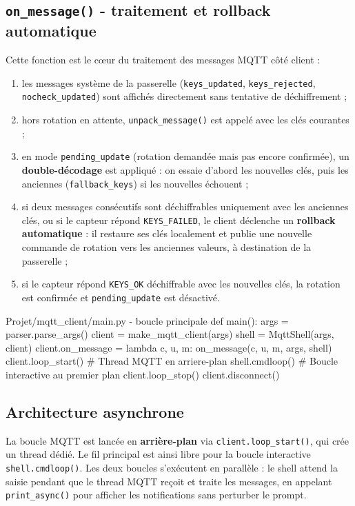 \documentclass[a4paper,11pt]{report}
\begin{document}
\subsection{\texttt{on\_message()} - traitement et rollback automatique}
Cette fonction est le cœur du traitement des messages MQTT côté client :
\begin{enumerate}
    \item les messages système de la passerelle (\texttt{keys\_updated}, \texttt{keys\_rejected},
    \texttt{nocheck\_updated}) sont affichés directement sans tentative de déchiffrement ;
    \item hors rotation en attente, \texttt{unpack\_message()} est appelé avec les clés courantes ;
    \item en mode \texttt{pending\_update} (rotation demandée mais pas encore confirmée), un
    \textbf{double-décodage} est appliqué : on essaie d'abord les nouvelles clés, puis les anciennes
    (\texttt{fallback\_keys}) si les nouvelles échouent ;
    \item si deux messages consécutifs sont déchiffrables uniquement avec les anciennes clés, ou si le
    capteur répond \texttt{KEYS\_FAILED}, le client déclenche un \textbf{rollback automatique} : il
    restaure ses clés localement et publie une nouvelle commande de rotation vers les anciennes valeurs,
    à destination de la passerelle ;
    \item si le capteur répond \texttt{KEYS\_OK} déchiffrable avec les nouvelles clés, la rotation est
    confirmée et \texttt{pending\_update} est désactivé.
\end{enumerate}

\begin{pycode}{Projet/mqtt\_client/main.py - boucle principale}
def main():
    args = parser.parse_args()
    client = make_mqtt_client(args)
    shell = MqttShell(args, client)
    client.on_message = lambda c, u, m: on_message(c, u, m, args, shell)
    client.loop_start()   # Thread MQTT en arriere-plan
    shell.cmdloop()       # Boucle interactive au premier plan
    client.loop_stop()
    client.disconnect()
\end{pycode}

\subsection{Architecture asynchrone}
La boucle MQTT est lancée en \textbf{arrière-plan} via \texttt{client.loop\_start()}, qui crée un thread
dédié. Le fil principal est ainsi libre pour la boucle interactive \texttt{shell.cmdloop()}. Les deux
boucles s'exécutent en parallèle : le shell attend la saisie pendant que le thread MQTT reçoit et traite
les messages, en appelant \texttt{print\_async()} pour afficher les notifications sans perturber le prompt.
\end{document}
